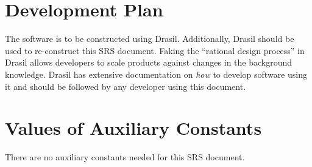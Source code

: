 \documentclass[12pt]{article}
\begin{document}

\section{Development Plan}
\label{sec_development_plan}

The software is to be constructed using Drasil. Additionally, Drasil should be
used to re-construct this SRS document. Faking the ``rational design process''
in Drasil allows developers to scale products against changes in the background
knowledge. Drasil has extensive documentation on \textit{how} to develop
software using it and should be followed by any developer using this document.


\section{Values of Auxiliary Constants}

There are no auxiliary constants needed for this SRS document.

\newpage


\printbibliography[heading=bibintoc]
\end{document}
